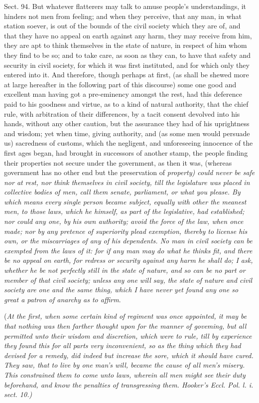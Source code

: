 \documentclass[11pt,openany]{book}
\begin{document}
Sect. 94. But whatever flatterers may talk to amuse people's understandings, it hinders not men from feeling; and when they perceive, that any man, in what station soever, is out of the bounds of the civil society which they are of, and that they have no appeal on earth against any harm, they may receive from him, they are apt to think themselves in the state of nature, in respect of him whom they find to be so; and to take care, as soon as they can, to have that safety and security in civil society, for which it was first instituted, and for which only they entered into it. And therefore, though perhaps at first, (as shall be shewed more at large hereafter in the following part of this discourse) some one good and excellent man having got a pre-eminency amongst the rest, had this deference paid to his goodness and virtue, as to a kind of natural authority, that the chief rule, with arbitration of their differences, by a tacit consent devolved into his hands, without any other caution, but the assurance they had of his uprightness and wisdom; yet when time, giving authority, and (as some men would persuade us) sacredness of customs, which the negligent, and unforeseeing innocence of the first ages began, had brought in successors of another stamp, the people finding their properties not secure under the government, as then it was, (whereas government has no other end but the preservation of \emph{property) could never be safe nor at rest, nor think themselves in civil society, till the legislature was placed in collective bodies of men, call them senate, parliament, or what you please. By which means every single person became subject, equally with other the meanest men, to those laws, which he himself, as part of the legislative, had established; nor could any one, by his own authority; avoid the force of the law, when once made; nor by any pretence of superiority plead exemption, thereby to license his own, or the miscarriages of any of his dependents. No man in civil society can be exempted from the laws of it: for if any man may do what he thinks fit, and there be no appeal on earth, for redress or security against any harm he shall do; I ask, whether he be not perfectly still in the state of nature, and so can be no part or member of that civil society; unless any one will say, the state of nature and civil society are one and the same thing, which I have never yet found any one so great a patron of anarchy as to affirm}.

(\emph{At the first, when some certain kind of regiment was once appointed, it may be that nothing was then farther thought upon for the manner of goveming, but all permitted unto their wisdom and discretion, which were to rule, till by experience they found this for all parts very inconvenient, so as the thing which they had devised for a remedy, did indeed but increase the sore, which it should have cured. They saw, that to live by one man's will, became the cause of all men's misery. This constrained them to come unto laws, wherein all men might see their duty beforehand, and know the penalties of transgressing them. Hooker's Eccl. Pol. l. i. sect. 10.)}
\end{document}
